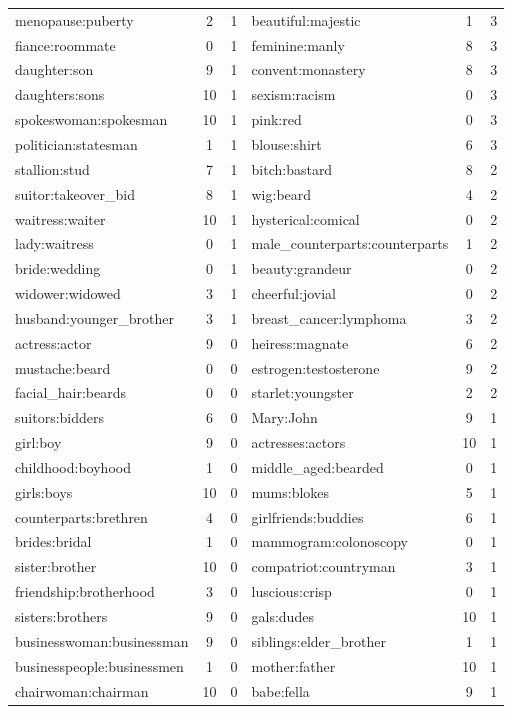 \documentclass{article}
\begin{document}
\begin{longtable}{l|c|c|l|c|c}
menopause:puberty & 2 & 1 & beautiful:majestic & 1 &3 \\
fiance:roommate & 0 & 1 & feminine:manly & 8 &3 \\
daughter:son & 9 & 1 & convent:monastery & 8 &3 \\
daughters:sons & 10 & 1 & sexism:racism & 0 &3 \\
spokeswoman:spokesman & 10 & 1 & pink:red & 0 &3 \\
politician:statesman & 1 & 1 & blouse:shirt & 6 &3 \\
stallion:stud & 7 & 1 & bitch:bastard & 8 &2 \\
suitor:takeover\_bid & 8 & 1 & wig:beard & 4 &2 \\
waitress:waiter & 10 & 1 & hysterical:comical & 0 &2 \\
lady:waitress & 0 & 1 & male\_counterparts:counterparts & 1 &2 \\
bride:wedding & 0 & 1 & beauty:grandeur & 0 &2 \\
widower:widowed & 3 & 1 & cheerful:jovial & 0 &2 \\
husband:younger\_brother & 3 & 1 & breast\_cancer:lymphoma & 3 &2 \\
actress:actor & 9 & 0 & heiress:magnate & 6 &2 \\
mustache:beard & 0 & 0 & estrogen:testosterone & 9 &2 \\
facial\_hair:beards & 0 & 0 & starlet:youngster & 2 &2 \\
suitors:bidders & 6 & 0 & Mary:John & 9 &1 \\
girl:boy & 9 & 0 & actresses:actors & 10 &1 \\
childhood:boyhood & 1 & 0 & middle\_aged:bearded & 0 &1 \\
girls:boys & 10 & 0 & mums:blokes & 5 &1 \\
counterparts:brethren & 4 & 0 & girlfriends:buddies & 6 &1 \\
brides:bridal & 1 & 0 & mammogram:colonoscopy & 0 &1 \\
sister:brother & 10 & 0 & compatriot:countryman & 3 &1 \\
friendship:brotherhood & 3 & 0 & luscious:crisp & 0 &1 \\
sisters:brothers & 9 & 0 & gals:dudes & 10 &1 \\
businesswoman:businessman & 9 & 0 & siblings:elder\_brother & 1 &1 \\
businesspeople:businessmen & 1 & 0 & mother:father & 10 &1 \\
chairwoman:chairman & 10 & 0 & babe:fella & 9 &1 \\

\end{longtable}
\end{document}
